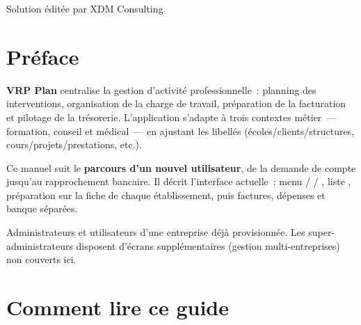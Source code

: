 \begin{titlepage}
  \centering
  \vspace*{2cm}
  {\Large\textsf{\manualeditor}\par}
  \vspace{1.5cm}
  {\fontsize{42}{48}\selectfont\bfseries\color{vrpdark}\manueltitle\par}
  \vspace{0.8cm}
  {\LARGE\manualsubtitle\par}
  \vspace{2cm}
  \vfill
  {\large\manualversion\par}
  \vspace{0.5cm}
  {\small Solution éditée par XDM Consulting\par}
\end{titlepage}

\chapter*{Préface}

\textbf{VRP Plan} centralise la gestion d'activité professionnelle~: planning des interventions, organisation de la charge de travail, préparation de la facturation et pilotage de la trésorerie. L'application s'adapte à trois contextes métier~--- formation, conseil et médical~--- en ajustant les libellés (écoles/clients/structures, cours/projets/prestations, etc.).

Ce manuel suit le \textbf{parcours d'un nouvel utilisateur}, de la demande de compte jusqu'au rapprochement bancaire. Il décrit l'interface actuelle~: menu  /  / , liste , préparation sur la fiche de chaque établissement, puis factures, dépenses et banque séparées.

\begin{astuce}
  Administrateurs et utilisateurs d'une entreprise déjà provisionnée. Les super-administrateurs disposent d'écrans supplémentaires (gestion multi-entreprises) non couverts ici.
\end{astuce}

\chapter*{Comment lire ce guide}

